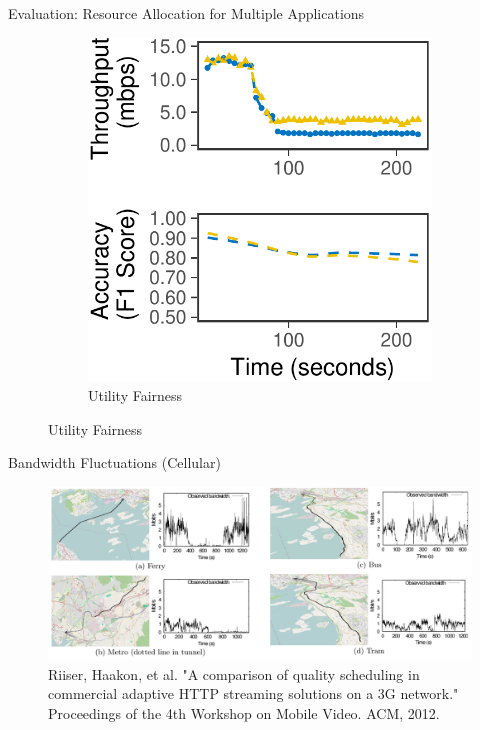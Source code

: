 \begin{frame}{Evaluation: Resource Allocation for Multiple Applications}
\begin{figure}
\begin{subfigure}[t]{0.45\columnwidth}
      \includegraphics[width=\textwidth]{figures/multitask-right.pdf}
      \caption{Utility Fairness}
      \label{fig:eq-acc}
    \end{subfigure}
  \end{figure}
\end{frame}

\begin{frame}{Bandwidth Fluctuations (Cellular)}
  \hypertarget{cellular-variation}{}
  \begin{figure}
    \includegraphics[width=\textwidth]{figures/bandwidth-cellular.pdf}
    \caption{Riiser, Haakon, et al. "A comparison of quality scheduling in
      commercial adaptive HTTP streaming solutions on a 3G network."
      Proceedings of the 4th Workshop on Mobile Video. ACM, 2012.}
  \end{figure}
\end{frame}

